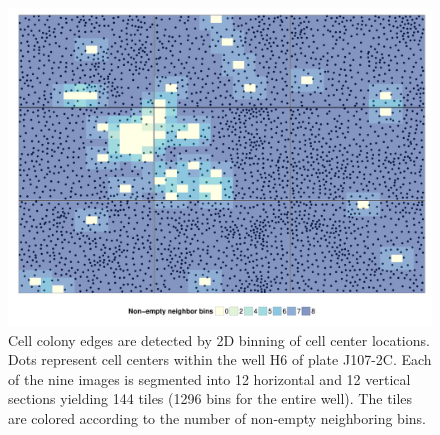 \begin{knitrout}
\color{fgcolor}\begin{figure}
\includegraphics[width=\maxwidth]{figures/R/scf-intro/plot-scf-intro_plot-1} \caption[Visualization of cell colony edge detection by 2D binning.]{Cell colony edges are detected by 2D binning of cell center locations. Dots represent cell centers within the well H6 of plate J107-2C. Each of the nine images is segmented into 12 horizontal and 12 vertical sections yielding 144 tiles (1296 bins for the entire well). The tiles are colored according to the number of non-empty neighboring bins.}\label{fig:scf-intro_plot}
\end{figure}


\end{knitrout}

